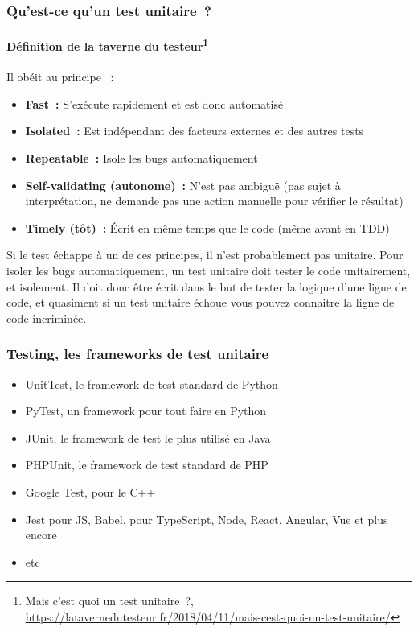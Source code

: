 \documentclass{beamer}
\begin{document}
    \begin{frame}
        \frametitle{Qu’est-ce qu’un test unitaire~?}
        \framesubtitle{Définition de la taverne du testeur\footnote{Mais c’est quoi un test unitaire~?, \url{https://latavernedutesteur.fr/2018/04/11/mais-cest-quoi-un-test-unitaire/}}}
        \transdissolve
        Il obéit au principe ~:
        \begin{itemize}
            \item \textbf{Fast~:} S’exécute rapidement et est donc automatisé
            \item \textbf{Isolated~:} Est indépendant des facteurs externes et des autres tests
            \item \textbf{Repeatable~:} Isole les bugs automatiquement
            \item \textbf{Self-validating (autonome)~:} N’est pas ambiguë (pas sujet à interprétation, ne demande pas une action manuelle pour vérifier le résultat)
            \item \textbf{Timely (tôt)~:} Écrit en même temps que le code (même avant en TDD)
        \end{itemize}
        Si le test échappe à un de ces principes, il n'est probablement pas unitaire.
        \bigbreak
        Pour isoler les bugs automatiquement, un test unitaire doit tester le code unitairement, et isolement.
        Il doit donc être écrit dans le but de tester la logique d’une ligne de code, et quasiment si un test unitaire échoue vous pouvez connaitre la ligne de code incriminée.
    \end{frame}

    \begin{frame}
        \transdissolve
        \frametitle{Testing, les frameworks de test unitaire}
        \begin{itemize}
            \item UnitTest, le framework de test standard de Python
            \item PyTest, un framework pour tout faire en Python
            \item JUnit, le framework de test le plus utilisé en Java
            \item PHPUnit, le framework de test standard de PHP
            \item Google Test, pour le C++
            \item Jest pour JS, Babel, pour TypeScript, Node, React, Angular, Vue et plus encore
            \item etc
        \end{itemize}
    \end{frame}
\end{document}
